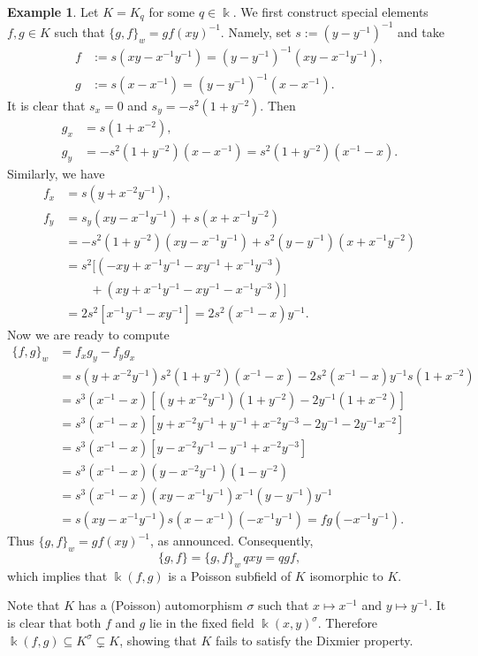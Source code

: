 \documentclass[12pt]{amsart}
\theoremstyle{plain}
\numberwithin{theorem}{section}
\numberwithin{equation}{theorem}
\theoremstyle{definition}
\newtheorem{example}[theorem]{Example}
\begin{document}
\begin{example}
\label{zzexa4.11}  
Let $K = K_q$ for some $q \in \Bbbk$. We first construct special elements $f,g \in K$ such that $\{g,f\}_w = gf(xy)^{-1}$.  Namely, set $s := (y-y^{-1})^{-1}$ and take
\begin{align*}
f& := s(xy-x^{-1}y^{-1})=(y-y^{-1})^{-1}(xy-x^{-1}y^{-1}),\\
g& := s(x-x^{-1})=(y-y^{-1})^{-1}(x-x^{-1}).
\end{align*}
It is clear that $s_x=0$ and $s_y=-s^2(1+y^{-2})$. Then
$$\begin{aligned}
g_x&=s(1+x^{-2}),\\
g_y&=-s^{2}(1+y^{-2})(x-x^{-1})=s^{2}(1+y^{-2})(x^{-1}-x).
\end{aligned}
$$
Similarly, we have
$$
\begin{aligned}
f_x&= s (y+x^{-2}y^{-1}),\\
f_y&= s_y (xy-x^{-1}y^{-1})+s (x+x^{-1}y^{-2})\\
&=-s^2(1+y^{-2})(xy-x^{-1}y^{-1})+s^{2} (y-y^{-1})(x+x^{-1}y^{-2})\\
&=s^2 [(-xy+x^{-1}y^{-1}-xy^{-1}+x^{-1}y^{-3})\\
&\qquad +(xy+x^{-1}y^{-1}-xy^{-1}-x^{-1}y^{-3})]\\
&=2s^2[x^{-1}y^{-1}-xy^{-1}]=2s^2 (x^{-1}-x) y^{-1}.
\end{aligned}
$$
Now we are ready to compute
$$\begin{aligned}
\{f,g\}_w &= f_x g_y-f_y g_x  \\
&= s (y+x^{-2}y^{-1})s^{2}(1+y^{-2})(x^{-1}-x)
-2s^2 (x^{-1}-x) y^{-1}s(1+x^{-2})\\
&=s^3(x^{-1}-x)
[(y+x^{-2}y^{-1})(1+y^{-2})-2 y^{-1}(1+x^{-2})]\\
&=s^3(x^{-1}-x)
[y+x^{-2}y^{-1} + y^{-1}+x^{-2}y^{-3}-2 y^{-1}-2y^{-1}x^{-2}]\\
&=s^3(x^{-1}-x)
[y-x^{-2}y^{-1} - y^{-1}+x^{-2}y^{-3}]\\
&=s^3(x^{-1}-x)
(y-x^{-2}y^{-1})(1-y^{-2})\\
&=s^3(x^{-1}-x)(xy-x^{-1}y^{-1}) x^{-1}(y-y^{-1})y^{-1}\\
&=s (xy-x^{-1}y^{-1}) s (x-x^{-1}) (-x^{-1}y^{-1})=fg (-x^{-1}y^{-1}).
\end{aligned}
$$
Thus $\{g,f\}_w = gf(xy)^{-1}$, as announced.  Consequently,
$$
\{g,f\} =  \{g,f\}_w \, qxy = qgf,
$$
which implies that $\Bbbk(f,g)$ is a Poisson subfield of $K$ isomorphic to $K$.

Note that $K$ has a (Poisson) 
automorphism $\sigma$ such that $x \mapsto x^{-1}$ and $y \mapsto y^{-1}$.  It is clear that
both $f$ and $g$ lie in the fixed field $\Bbbk(x,y)^{\sigma}$. Therefore $\Bbbk(f,g) \subseteq K^{\sigma} \subsetneq K$, showing that $K$ fails to satisfy the Dixmier property.
\end{example}
\end{document}
